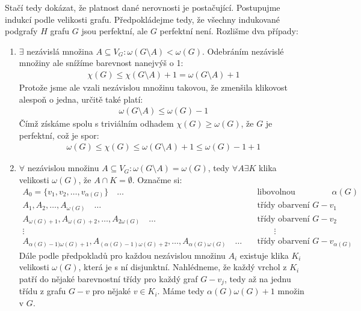 \documentclass{article}
\begin{document}
Stačí tedy dokázat, že platnost dané nerovnosti je postačující. Postupujme 
indukcí podle velikosti grafu. Předpokládejme tedy, že všechny indukované 
podgrafy $H$ grafu $G$ jsou perfektní, ale $G$ perfektní není. Rozlišme dva 
případy:
\begin{enumerate}
	\item $\exists$ nezávislá množina $A \subseteq V_G: \omega(G\setminus A) < 
	\omega(G)$. Odebráním nezávislé množiny ale snížíme barevnost nanejvýš o 1:
	\begin{align}
		\chi(G) \leq \chi(G\setminus A) + 1 = \omega(G \setminus A) + 1
	\end{align}
	Protože jsme ale vzali nezávislou množinu takovou, že zmenšila klikovost 
	alespoň o jedna, určitě také platí:
	\begin{align}
		\omega(G \setminus A) \leq \omega(G) -1
	\end{align}
	Čímž získáme spolu s triviálním odhadem $\chi(G) \geq \omega(G)$, že $G$ je 
	perfektní, což je spor:
	\begin{align}
		\omega(G) \leq \chi(G) \leq \omega(G \setminus A) + 1 \leq \omega(G) -1 
		+ 1
	\end{align}
	\item $\forall$ nezávislou množinu $A \subseteq V_G: \omega(G\setminus A) = 
	\omega(G)$, tedy $\forall A \exists K$ klika velikosti $\omega(G)$, že $A 
	\cap K = \emptyset$. Označme si:
	\begin{align}
		A_0 = \{v_1, v_2, \dots, v_{\alpha(G)}\} \quad \dots \quad & 
		\text{libovolnou nezávislou  množinu velikosti } \alpha(G)\\
		A_1, A_2, \dots, A_{\omega(G)} \quad \dots \quad & \text{třídy obarvení 
		} G-v_1 \\
		A_{\omega(G) + 1}, A_{\omega(G) + 2}, \dots, A_{2\omega(G)} \quad \dots 
		\quad & \text{třídy obarvení } G-v_2 \\
		\vdots\qquad\qquad\qquad&\qquad\vdots \\
		A_{\alpha(G)-1)\omega(G) + 1}, A_{(\alpha(G)-1)\omega(G)+2}, \dots, 
		A_{\alpha(G)\omega(G)} \quad \dots \quad & \text{třídy obarvení } G- 
		v_{\alpha(G)}
	\end{align}
	Dále podle předpokladů pro každou nezávislou množinu $A_i$ existuje klika 
	$K_i$ velikosti $\omega(G)$, která je s ní disjunktní. Nahlédneme, že každý 
	vrchol z $K_i$ patří do nějaké barevnostní třídy pro každý graf $G - v_j$, 
	tedy až na jednu třídu z grafu $G - v$ pro nějaké $v \in K_i$. Máme tedy 
	$\alpha(G)\omega(G)+1$ množin v $G$.


\end{enumerate}
\end{document}
